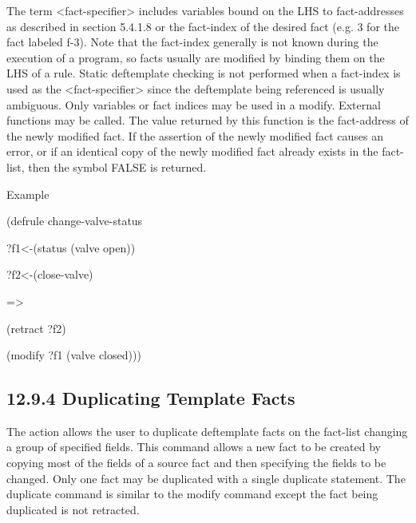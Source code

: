 \documentclass[letterpaper,10pt,english]{sphinxmanual}
\begin{document}

\begin{sphinxVerbatim}[commandchars=\\\{\}]
  
\end{sphinxVerbatim}

The term \textless{}fact-specifier\textgreater{} includes variables bound on the LHS to
fact-addresses as described in section 5.4.1.8 or the fact-index of the
desired fact (e.g. 3 for the fact labeled f-3). Note that the fact-index
generally is not known during the execution of a program, so facts
usually are modified by binding them on the LHS of a rule. Static
deftemplate checking is not performed when a fact-index is used as the
\textless{}fact-specifier\textgreater{} since the deftemplate being referenced is usually
ambiguous. Only variables or fact indices may be used in a modify.
External functions may  be called. The value returned by this
function is the fact-address of the newly modified fact. If the
assertion of the newly modified fact causes an error, or if an identical
copy of the newly modified fact already exists in the fact-list, then
the symbol FALSE is returned.

Example

\begin{DUlineblock}{0em}
\item[] (defrule change-valve-status
\item[] ?f1\textless{}-(status (valve open))
\item[] ?f2\textless{}-(close-valve)
\item[] =\textgreater{}
\item[] (retract ?f2)
\item[] (modify ?f1 (valve closed)))
\end{DUlineblock}


\subsection{12.9.4 Duplicating Template Facts}
\label{\detokenize{actions:duplicating-template-facts}}
The  action allows the user to duplicate deftemplate facts
on the fact-list changing a group of specified fields. This command
allows a new fact to be created by copying most of the fields of a
source fact and then specifying the fields to be changed. Only one fact
may be duplicated with a single duplicate statement. The duplicate
command is similar to the modify command except the fact being
duplicated is not retracted.
\end{document}
